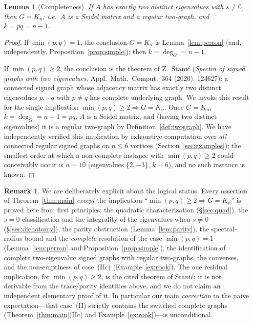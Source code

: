 \documentclass{amsart}
\newtheorem{lemma}{Lemma}
\theoremstyle{definition}
\newtheorem{remark}{Remark}
\begin{document}
\begin{lemma}[Completeness]\label{lem:complete}
If $A$ has exactly two distinct eigenvalues with $s\ne0$, then $G=K_n$; i.e.\
$A$ is a Seidel matrix and a regular two-graph, and $k=pq=n-1$.
\end{lemma}

\begin{proof}
If $\min(p,q)=1$, the conclusion $G=K_n$ is Lemma~\ref{lem:perron} (and,
independently, Proposition~\ref{prop:simple}); then $k=\deg_G=n-1$.

If $\min(p,q)\ge2$, the conclusion is the theorem of Z.\ Stani\'c
(\emph{Spectra of signed graphs with two eigenvalues}, Appl.\ Math.\ Comput.\
364 (2020), 124627): a connected signed graph whose adjacency matrix has
exactly two distinct eigenvalues $p,-q$ with $p\ne q$ has complete underlying
graph. We invoke this result for the single implication $\min(p,q)\ge2
\Rightarrow G=K_n$. Once $G=K_n$, $k=\deg_G=n-1=pq$, $A$ is a Seidel matrix,
and (having two distinct eigenvalues) it is a regular two-graph by
Definition~\ref{def:twograph}. We have independently verified this implication
by exhaustive computation over \emph{all} connected regular signed graphs on
$n\le 6$ vertices (Section~\ref{sec:examples}); the smallest order at which a
non-complete instance with $\min(p,q)\ge2$ could conceivably occur is $n=10$
(eigenvalues $\{2,-3\}$, $k=6$), and no such instance is known.
\end{proof}

\begin{remark}\label{rem:honest-complete}
We are deliberately explicit about the logical status. Every assertion of
Theorem~\ref{thm:main} \emph{except} the implication
``$\min(p,q)\ge2\Rightarrow G=K_n$'' is proved here from first principles: the
quadratic characterization (\S\ref{sec:quad}), the $s=0$ classification and the
integrality of the eigenvalues when $s\ne0$ (\S\ref{sec:dichotomy}), the
parity obstruction (Lemma~\ref{lem:parity}), the spectral-radius bound and the
\emph{complete} resolution of the case $\min(p,q)=1$
(Lemma~\ref{lem:perron} and Proposition~\ref{prop:simple}), the identification of
complete two-eigenvalue signed graphs with regular two-graphs, the converses,
and the non-emptiness of case~(IIc) (Example~\ref{ex:rook}). The one residual
implication, for $\min(p,q)\ge2$, is the cited theorem of Stani\'c; it is not
derivable from the trace/parity identities above, and we do not claim an
independent elementary proof of it. In particular our main \emph{correction} to
the naive expectation---that case~(II) strictly contains the switched complete
graphs (Theorem~\ref{thm:main}(IIc) and Example~\ref{ex:rook})---is
unconditional.
\end{remark}
\end{document}
